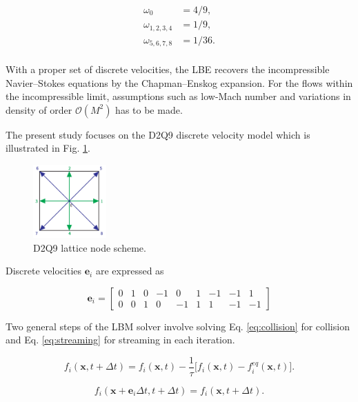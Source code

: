 \begin{align}
	\label{weights}
	\omega_0 &= 4/9,\\
	\omega_{1,2,3,4} &= 1/9,\\
	\omega_{5,6,7,8} &= 1/36.\\
\end{align}

With a proper set of discrete velocities, the LBE recovers the incompressible Navier–Stokes equations by the Chapman–Enskog expansion. For the flows within the incompressible limit, assumptions such as low-Mach number and variations in density of order $\mathcal{O}(M^2)$ has to be made.

The present study focuses on the D2Q9 discrete velocity model which is illustrated in Fig. \ref{fig:d2q9-node}. 

\begin{figure}[!ht]
	\centering
	\captionsetup{justification=centering}
	\includegraphics[width=0.25\textwidth]{figures/D2Q9_colored.pdf}
	\caption{D2Q9 lattice node scheme.}
	\label{fig:d2q9-node}
\end{figure}

Discrete velocities $\bm{e}_i$ are expressed as

\begin{equation}
	\label{discrete-velocities}
	\bm{e}_i = \begin{bmatrix}
		0 & 1 & 0 &-1 & 0 & 1 &-1 &-1 & 1\\
		0 & 0 & 1 & 0 &-1 & 1 & 1 &-1 &-1
	\end{bmatrix}
\end{equation}

Two general steps of the LBM solver involve solving  Eq. \ref{eq:collision} for collision and Eq. \ref{eq:streaming} for streaming in each iteration.

\begin{equation}
	\label{eq:collision}
	f_i (\bm{x},t+\Delta t) = f_i (\bm{x},t)-\frac{1}{\tau}\Big[f_i (\bm{x},t) - f_i^{eq} (\bm{x},t)\Big].
\end{equation}

\begin{equation}
	\label{eq:streaming}
	f_i (\bm{x}+\bm{e}_i\Delta t,t+\Delta t) = f_i (\bm{x},t+\Delta t).
\end{equation}

